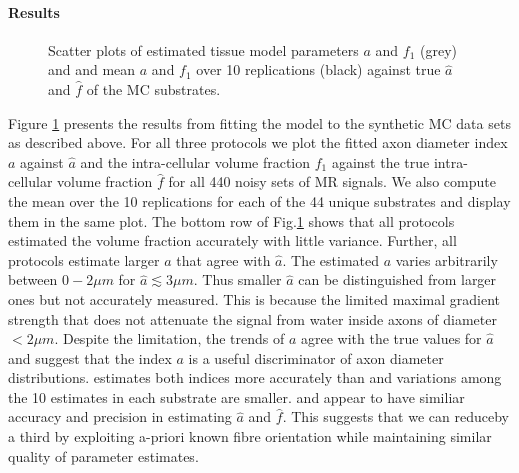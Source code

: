 \paragraph{Results}
\begin{figure}
\centering
  \caption{Scatter plots of estimated tissue model parameters $a$ and $f_1$ (grey) and and mean $a$ and $f_1$ over 10 replications (black) against true $\hat{a}$ and $\hat{f}$ of the MC substrates.}
  \label{fig:mc simulations}
\end{figure}
Figure \ref{fig:mc simulations} presents the results from fitting the model to the synthetic MC data sets as described above. For all three protocols we plot the fitted axon diameter index $a$ against $\hat{a}$ and the intra-cellular volume fraction $f_1$ against the true intra-cellular volume fraction $\hat{f}$ for all 440 noisy sets of MR signals. We also compute the mean over the 10 replications for each of the 44 unique substrates and display them in the same plot. The bottom row of Fig.\ref{fig:mc simulations} shows that all protocols estimated the volume fraction accurately with little variance. Further, all protocols estimate larger $a$ that agree with $\hat{a}$. The estimated $a$ varies arbitrarily between $0-2\mu m$ for $\hat{a} \lesssim 3\mu m$. Thus smaller $\hat{a}$ can be distinguished from larger ones but not accurately measured. This is because the limited maximal gradient strength that does not attenuate the signal from water inside axons of diameter $<2\mu m$. Despite the limitation, the trends of $a$ agree with the true values for $\hat{a}$ and suggest that the index $a$ is a useful discriminator of axon diameter distributions. \SFlong{} estimates both indices more accurately than \OIlong{} and variations among the 10 estimates in each substrate are smaller. \SFshort{} and \OIlong{} appear to have similiar accuracy and precision in estimating $\hat{a}$ and $\hat{f}$. This suggests that we can reduceby a third by exploiting a-priori known fibre orientation while maintaining similar quality of parameter estimates.


